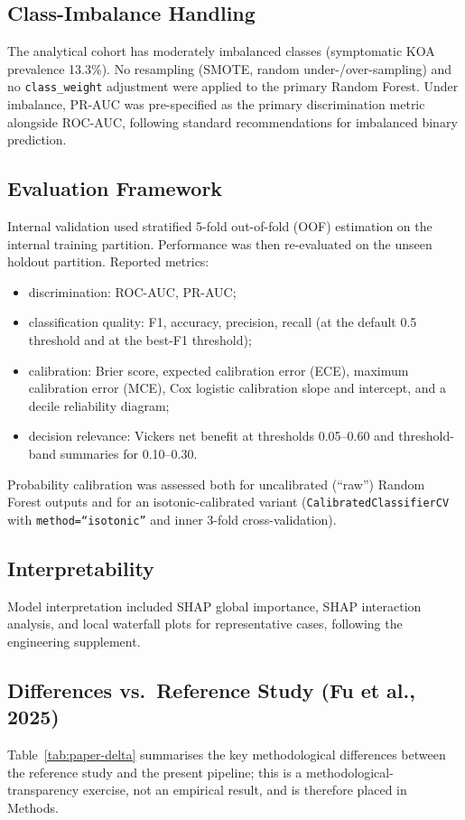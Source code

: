 \documentclass[11pt,a4paper]{article}
\begin{document}
\subsection{Class-Imbalance Handling}
The analytical cohort has moderately imbalanced classes (symptomatic KOA prevalence 13.3\%). No resampling (SMOTE, random under-/over-sampling) and no \texttt{class\_weight} adjustment were applied to the primary Random Forest. Under imbalance, PR-AUC was pre-specified as the primary discrimination metric alongside ROC-AUC, following standard recommendations for imbalanced binary prediction.

\subsection{Evaluation Framework}
Internal validation used stratified 5-fold out-of-fold (OOF) estimation on the internal training partition. Performance was then re-evaluated on the unseen holdout partition. Reported metrics:
\begin{itemize}
\item discrimination: ROC-AUC, PR-AUC;
\item classification quality: F1, accuracy, precision, recall (at the default 0.5 threshold and at the best-F1 threshold);
\item calibration: Brier score, expected calibration error (ECE), maximum calibration error (MCE), Cox logistic calibration slope and intercept, and a decile reliability diagram;
\item decision relevance: Vickers net benefit at thresholds 0.05--0.60 and threshold-band summaries for 0.10--0.30.
\end{itemize}

Probability calibration was assessed both for uncalibrated (``raw'') Random Forest outputs and for an isotonic-calibrated variant (\texttt{CalibratedClassifierCV} with \texttt{method=``isotonic''} and inner 3-fold cross-validation).

\subsection{Interpretability}
Model interpretation included SHAP global importance, SHAP interaction analysis, and local waterfall plots for representative cases, following the engineering supplement.

\subsection{Differences vs.\ Reference Study (Fu et al., 2025)}
Table~\ref{tab:paper-delta} summarises the key methodological differences between the reference study and the present pipeline; this is a methodological-transparency exercise, not an empirical result, and is therefore placed in Methods.
\end{document}
